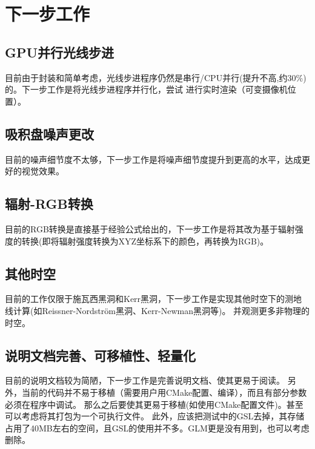 \documentclass[a4paper, 12pt]{article}
\begin{document}
    \section{下一步工作}
    \subsection{GPU并行光线步进}
    目前由于封装和简单考虑，光线步进程序仍然是串行/CPU并行(提升不高,约30\%)的。下一步工作是将光线步进程序并行化，尝试
    进行实时渲染（可变摄像机位置）。
    \subsection{吸积盘噪声更改}
    目前的噪声细节度不太够，下一步工作是将噪声细节度提升到更高的水平，达成更好的视觉效果。
    \subsection{辐射-RGB转换}
    目前的RGB转换是直接基于经验公式给出的，下一步工作是将其改为基于辐射强度的转换(即将辐射强度转换为XYZ坐标系下的颜色，再转换为RGB)。
    \subsection{其他时空}
    目前的工作仅限于施瓦西黑洞和Kerr黑洞，下一步工作是实现其他时空下的测地线计算(如Reissner-Nordström黑洞、Kerr-Newman黑洞等)。
    并观测更多非物理的时空。
    \subsection{说明文档完善、可移植性、轻量化}
    目前的说明文档较为简陋，下一步工作是完善说明文档、使其更易于阅读。
    另外，当前的代码并不易于移植（需要用户用CMake配置、编译），而且有部分参数必须在程序中调试。
    那么之后要使其更易于移植(如使用CMake配置文件)。甚至可以考虑将其打包为一个可执行文件。
    此外，应该把测试中的GSL去掉，其存储占用了40MB左右的空间，且GSL的使用并不多。GLM更是没有用到，也可以考虑删除。
\end{document}
